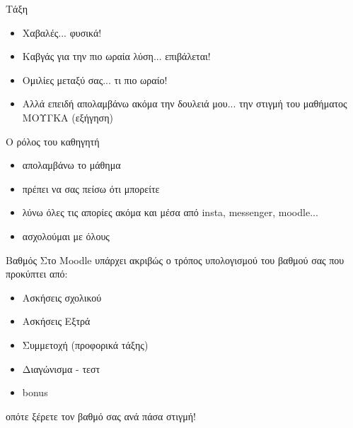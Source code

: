 \documentclass{presentation}
\begin{document}
\begin{frame}{Τάξη}
  \begin{itemize}
    \item Χαβαλές... φυσικά! \pause
    \item Καβγάς για την πιο ωραία λύση... επιβάλεται! \pause
    \item Ομιλίες μεταξύ σας... τι πιο ωραίο! \pause
    \item Αλλά επειδή απολαμβάνω ακόμα την δουλειά μου... την στιγμή του μαθήματος ΜΟΥΓΚΑ (εξήγηση)
  \end{itemize}
\end{frame}

\begin{frame}{Ο ρόλος του καθηγητή}
  \begin{itemize}
    \item απολαμβάνω το μάθημα \pause
    \item πρέπει να σας πείσω ότι μπορείτε \pause
    \item λύνω όλες τις απορίες ακόμα και μέσα από insta, messenger, moodle... \pause
    \item ασχολούμαι με όλους \pause
  \end{itemize}
\end{frame}

\begin{frame}{Βαθμός}
  Στο Moodle υπάρχει ακριβώς ο τρόπος υπολογισμού του βαθμού σας που προκύπτει από:
  \begin{itemize}
    \item Ασκήσεις σχολικού
    \item Ασκήσεις Εξτρά
    \item Συμμετοχή (προφορικά τάξης)
    \item Διαγώνισμα - τεστ
    \item bonus
  \end{itemize}
  οπότε ξέρετε τον βαθμό σας ανά πάσα στιγμή!
\end{frame}
\end{document}
